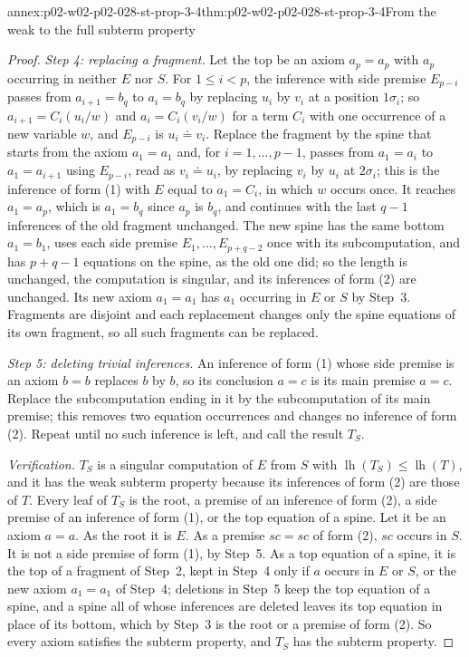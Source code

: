 \begin{annexitem}{annex:p02-w02-p02-028-st-prop-3-4}{thm:p02-w02-p02-028-st-prop-3-4}{From the weak to the full subterm property}
\begin{proof}
\emph{Step 4: replacing a fragment.}  Let the top be an axiom \(a_p=a_p\)
with \(a_p\) occurring in neither \(E\) nor \(S\).  For \(1\leq i<p\), the
inference with side premise \(E_{p-i}\) passes from \(a_{i+1}=b_q\) to
\(a_i=b_q\) by replacing \(u_i\) by \(v_i\) at a position \(1\sigma_i\); so
\(a_{i+1}=C_i(u_i/w)\) and \(a_i=C_i(v_i/w)\) for a term \(C_i\) with one
occurrence of a new variable \(w\), and \(E_{p-i}\) is \(u_i\doteq v_i\).
Replace the fragment by the spine that starts from the axiom \(a_1=a_1\) and,
for \(i=1,\ldots,p-1\), passes from \(a_1=a_i\) to \(a_1=a_{i+1}\) using
\(E_{p-i}\), read as \(v_i\doteq u_i\), by replacing \(v_i\) by \(u_i\) at
\(2\sigma_i\); this is the inference of form (1) with \(E\) equal to
\(a_1=C_i\), in which \(w\) occurs once.  It reaches \(a_1=a_p\), which is
\(a_1=b_q\) since \(a_p\) is \(b_q\), and continues with the last \(q-1\)
inferences of the old fragment unchanged.  The new spine has the same
bottom \(a_1=b_1\), uses each side premise \(E_1,\ldots,E_{p+q-2}\) once with
its subcomputation, and has \(p+q-1\) equations on the spine, as the old one
did; so the length is unchanged, the computation is singular, and its
inferences of form (2) are unchanged.  Its new axiom \(a_1=a_1\) has \(a_1\)
occurring in \(E\) or \(S\) by Step~3.  Fragments are disjoint and each
replacement changes only the spine equations of its own fragment, so all
such fragments can be replaced.

\emph{Step 5: deleting trivial inferences.}  An inference of form (1) whose
side premise is an axiom \(b=b\) replaces \(b\) by \(b\), so its conclusion
\(a=c\) is its main premise \(a=c\).  Replace the subcomputation ending in it
by the subcomputation of its main premise; this removes two equation
occurrences and changes no inference of form (2).  Repeat until no such
inference is left, and call the result \(T_S\).

\emph{Verification.}  \(T_S\) is a singular computation of \(E\) from
\(S\) with \(\operatorname{lh}(T_S)\leq\operatorname{lh}(T)\), and it has the
weak subterm property because its inferences of form (2) are those of \(T\).
Every leaf of \(T_S\) is the root, a premise of an inference of form (2), a
side premise of an inference of form (1), or the top equation of a spine.
Let it be an axiom \(a=a\).  As the root it is \(E\).  As a premise \(sc=sc\)
of form (2), \(sc\) occurs in \(S\).  It is not a side premise of form (1),
by Step~5.  As a top equation of a spine, it is the top of a fragment of
Step~2, kept in Step~4 only if \(a\) occurs in \(E\) or \(S\), or the new
axiom \(a_1=a_1\) of Step~4; deletions in Step~5 keep the top equation of a
spine, and a spine all of whose inferences are deleted leaves its top
equation in place of its bottom, which by Step~3 is the root or a premise of
form (2).  So every axiom satisfies the subterm property, and \(T_S\) has the
subterm property.
\end{proof}
\end{annexitem}

